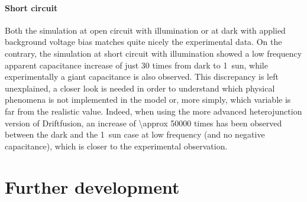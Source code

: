 
		\paragraph{Short circuit}
		Both the simulation at open circuit with illumination or at dark with applied background voltage bias matches quite nicely the experimental data.
		On the contrary, the simulation at short circuit with illumination showed a low frequency apparent capacitance increase of just 30 times from dark to 1~sun, while experimentally a giant capacitance is also observed.
		This discrepancy is left unexplained, a closer look is needed in order to understand which physical phenomena is not implemented in the model or, more simply, which variable is far from the realistic value.
		Indeed, when using the more advanced heterojunction version of Driftfusion, an increase of \num{\approx 50000} times has been observed between the dark and the \SI{1}{sun} case at low frequency (and no negative capacitance), which is closer to the experimental observation.



\section{Further development}


